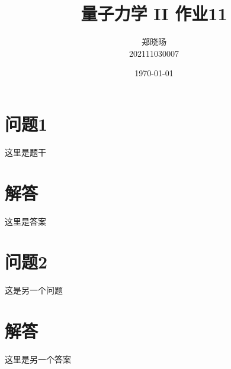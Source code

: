 \documentclass{article}
\begin{document}
\title{量子力学 II 作业11}
\author{郑晓旸 \\ 202111030007}
\date{\today}
\maketitle

\section*{问题1}
 这里是题干
\section*{解答}
 这里是答案
\newpage

\section*{问题2}
这是另一个问题
\section*{解答}
这里是另一个答案
\end{document}
